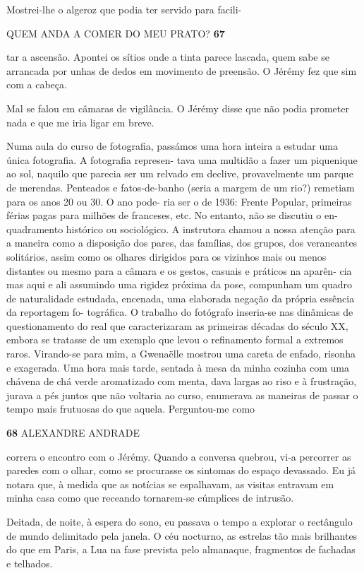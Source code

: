 Mostrei-lhe o algeroz que podia ter servido para facili-

QUEM ANDA A COMER DO MEU PRATO? \textbf{67}

tar a ascensão. Apontei os sítios onde a tinta parece lascada, quem sabe
se arrancada por unhas de dedos em movimento de preensão. O Jérémy fez
que sim com a cabeça.

Mal se falou em câmaras de vigilância. O Jérémy disse que não podia
prometer nada e que me iria ligar em breve.

Numa aula do curso de fotografia, passámos uma hora inteira a estudar
uma única fotografia. A fotografia represen- tava uma multidão a fazer
um piquenique ao sol, naquilo que parecia ser um relvado em declive,
provavelmente um parque de merendas. Penteados e fatos-de-banho (seria a
margem de um rio?) remetiam para os anos 20 ou 30. O ano pode- ria ser o
de 1936: Frente Popular, primeiras férias pagas para milhões de
franceses, etc. No entanto, não se discutiu o en- quadramento histórico
ou sociológico. A instrutora chamou a nossa atenção para a maneira como
a disposição dos pares, das famílias, dos grupos, dos veraneantes
solitários, assim como os olhares dirigidos para os vizinhos mais ou
menos distantes ou mesmo para a câmara e os gestos, casuais e práticos
na aparên- cia mas aqui e ali assumindo uma rigidez próxima da pose,
compunham um quadro de naturalidade estudada, encenada, uma elaborada
negação da própria essência da reportagem fo- tográfica. O trabalho do
fotógrafo inseria-se nas dinâmicas de questionamento do real que
caracterizaram as primeiras décadas do século XX, embora se tratasse de
um exemplo que levou o refinamento formal a extremos raros. Virando-se
para mim, a Gwenaëlle mostrou uma careta de enfado, risonha e exagerada.
Uma hora mais tarde, sentada à mesa da minha cozinha com uma chávena de
chá verde aromatizado com menta, dava largas ao riso e à frustração,
jurava a pés juntos que não voltaria ao curso, enumerava as maneiras de
passar o tempo mais frutuosas do que aquela. Perguntou-me como

\textbf{68 }ALEXANDRE ANDRADE

correra o encontro com o Jérémy. Quando a conversa quebrou, vi-a
percorrer as paredes com o olhar, como se procurasse os sintomas do
espaço devassado. Eu já notara que, à medida que as notícias se
espalhavam, as visitas entravam em minha casa como que receando
tornarem-se cúmplices de intrusão.

Deitada, de noite, à espera do sono, eu passava o tempo a explorar o
rectângulo de mundo delimitado pela janela. O céu nocturno, as estrelas
tão mais brilhantes do que em Paris, a Lua na fase prevista pelo
almanaque, fragmentos de fachadas e telhados.

